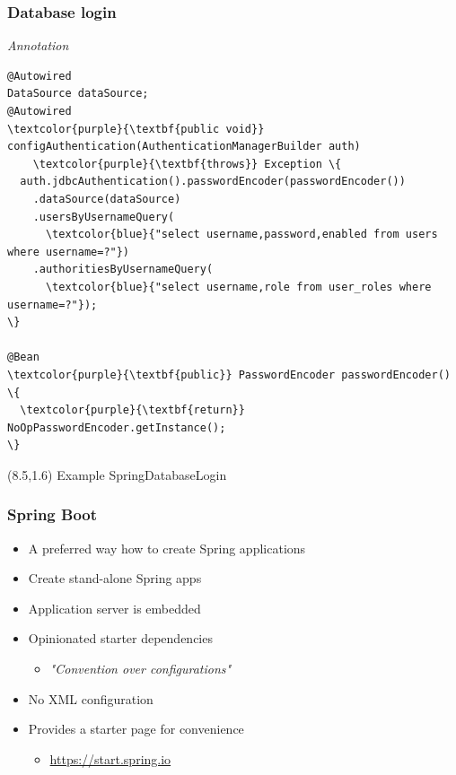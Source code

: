 \documentclass[10pt,xcolor=pdflatex, table]{beamer}
\begin{document}
\begin{frame}[fragile]\frametitle{Database login}
  \emph{Annotation}
  \begin{Verbatim}[fontsize=\footnotesize, commandchars=\\\{\}]  
@Autowired
DataSource dataSource;
@Autowired
\textcolor{purple}{\textbf{public void}} configAuthentication(AuthenticationManagerBuilder auth)
    \textcolor{purple}{\textbf{throws}} Exception \{
  auth.jdbcAuthentication().passwordEncoder(passwordEncoder())
    .dataSource(dataSource)
    .usersByUsernameQuery(
      \textcolor{blue}{"select username,password,enabled from users where username=?"})
    .authoritiesByUsernameQuery(
      \textcolor{blue}{"select username,role from user_roles where username=?"});
\}

@Bean
\textcolor{purple}{\textbf{public}} PasswordEncoder passwordEncoder() \{
  \textcolor{purple}{\textbf{return}} NoOpPasswordEncoder.getInstance();
\}
			\end{Verbatim}
\begin{textblock}{15}(8.5,1.6)
    {\footnotesize Example SpringDatabaseLogin}
\end{textblock}
\end{frame}

\begin{frame}\frametitle{Spring Boot}
  \begin{itemize}
    \item A preferred way how to create Spring applications
    \item Create stand-alone Spring apps
    \item Application server is embedded
    \item Opinionated starter dependencies
    \begin{itemize}
        \item \textit{"Convention over configurations"}
    \end{itemize}
    \item No XML configuration
    \item Provides a starter page for convenience
    \begin{itemize}
        \item \url{https://start.spring.io}
    \end{itemize}
  \end{itemize}
\end{frame}
\end{document}
